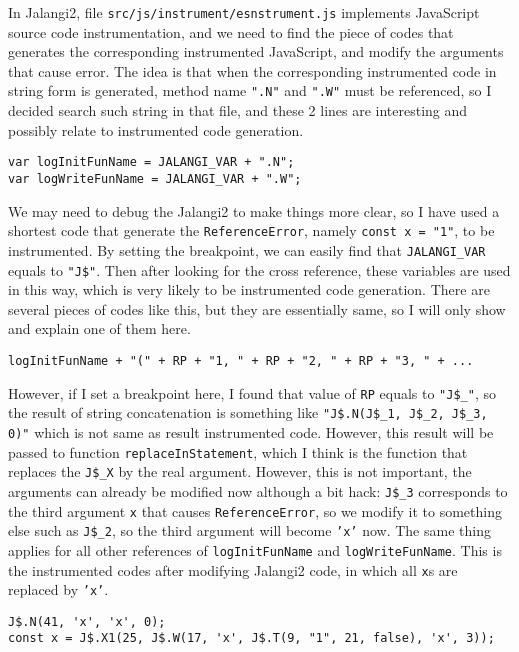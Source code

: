 In Jalangi2, file \texttt{src/js/instrument/esnstrument.js} implements JavaScript source code instrumentation, and we need to find the piece of codes that generates the corresponding instrumented JavaScript, and modify the arguments that cause error. The idea is that when the corresponding instrumented code in string form is generated, method name \texttt{".N"} and \texttt{".W"} must be referenced, so I decided search such string in that file, and these 2 lines are interesting and possibly relate to instrumented code generation.

\begin{verbatim}
var logInitFunName = JALANGI_VAR + ".N";
var logWriteFunName = JALANGI_VAR + ".W";
\end{verbatim}


We may need to debug the Jalangi2 to make things more clear, so I have used a shortest code that generate the \texttt{ReferenceError}, namely \texttt{const x = "1"}, to be instrumented. By setting the breakpoint, we can easily find that \texttt{JALANGI\_VAR} equals to \texttt{"J\$"}. Then after looking for the cross reference, these variables are used in this way, which is very likely to be instrumented code generation. There are several pieces of codes like this, but they are essentially same, so I will only show and explain one of them here.


\begin{verbatim}
logInitFunName + "(" + RP + "1, " + RP + "2, " + RP + "3, " + ... 
\end{verbatim}


However, if I set a breakpoint here, I found that value of \texttt{RP} equals to \texttt{"J\$\_"}, so the result of string concatenation is something like \texttt{"J\$.N(J\$\_1, J\$\_2, J\$\_3, 0)"} which is not same as result instrumented code. However, this result will be passed to function \texttt{replaceInStatement}, which I think is the function that replaces the \texttt{J\$\_X} by the real argument. However, this is not important, the arguments can already be modified now although a bit hack: \texttt{J\$\_3} corresponds to the third argument \texttt{x} that causes \texttt{ReferenceError}, so we modify it to something else such as \texttt{J\$\_2}, so the third argument will become \texttt{'x'} now. The same thing applies for all other references of \texttt{logInitFunName} and \texttt{logWriteFunName}. This is the instrumented codes after modifying Jalangi2 code, in which all \texttt{x}s are replaced by \texttt{'x'}.


\begin{verbatim}
J$.N(41, 'x', 'x', 0);
const x = J$.X1(25, J$.W(17, 'x', J$.T(9, "1", 21, false), 'x', 3));
\end{verbatim}
